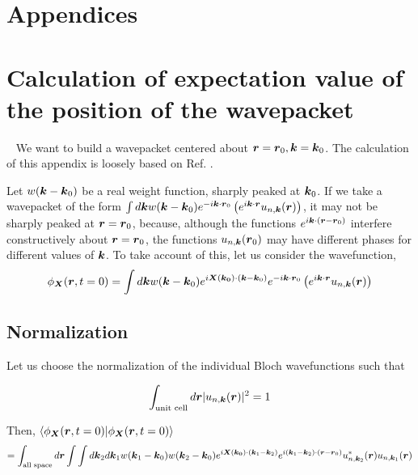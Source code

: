 \documentclass{report}
\renewcommand\vec[1]{\ensuremath\boldsymbol{#1}} %
\begin{document}
\chapter*{\center Appendices}%
%
\appendix

\chapter{Calculation of expectation value of the position of the wavepacket}~\label{app:center-at-zero-time}
We want to build a wavepacket centered about $\vec{r}= \vec{r}_0, \vec{k}= \vec{k}_0$. The calculation of this appendix is loosely based on Ref. \cite{ralph2020berry}.


Let  $w(\vec{k} - \vec{k}_0)$ be a real weight function, sharply peaked at $\vec{k}_0$. If we take a wavepacket of the form $\int d\vec{k} w(\vec{k} - \vec{k}_0) e^{-i \vec{k} \cdot \vec{r}_0 } \left(e^{i \vec{k} \cdot\vec{r}} u_{n,\vec{k}}(\vec{r})\right)$, it may not be sharply peaked at $\vec{r} = \vec{r}_0$, because, although the functions $e^{i \vec{k} \cdot(\vec{r} - \vec{r}_0)}$ interfere constructively about $\vec{r} = \vec{r}_0$, the functions $u_{n,\vec{k}}(\vec{r}_0)$ may have different phases for different values of $\vec{k}$. To take account of this, let us consider the wavefunction, 
\begin{equation}\label{Eq:wavefunction-X}
	\phi_{\vec{X}}(\vec{r}, t=0) = \int d\vec{k} w(\vec{k} - \vec{k}_0) e^{i \vec{X}(\vec{k_0})\cdot (\vec{k} - \vec{k}_0)} e^{-i \vec{k} \cdot \vec{r}_0 } \left(e^{i \vec{k} \cdot\vec{r}} u_{n,\vec{k}}(\vec{r})\right)
\end{equation}

\section{Normalization}\label{app:sec:Bloch-normalization}
 Let us choose the normalization of the individual Bloch wavefunctions such that

\begin{equation}\label{Eq:BlochNormalization}
	\int_{\text{unit cell}} d\vec{r} |u_{n,\vec{k}}(\vec{r})|^2 = 1
\end{equation}

Then, $\bra{\phi_{\vec{X}}(\vec{r}, t=0)}\ket{\phi_{\vec{X}}(\vec{r}, t=0)}$
$$ = \int_{\text{all space}} d\vec{r} \int \int d\vec{k}_2 d\vec{k}_1  w(\vec{k}_1 - \vec{k}_0) w(\vec{k}_2 - \vec{k}_0) e^{i \vec{X}(\vec{k_0})\cdot (\vec{k}_1 - \vec{k}_2)} e^{i (\vec{k}_1 - \vec{k}_2) \cdot (\vec{r} - \vec{r}_0) }  u^*_{n,\vec{k}_2}(\vec{r}) u_{n,\vec{k}_1}(\vec{r})$$
\end{document}
